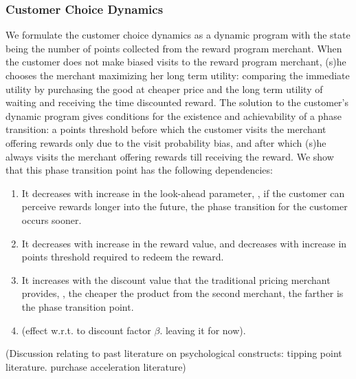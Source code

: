 \subsubsection{Customer Choice Dynamics}
We formulate the customer choice dynamics as a dynamic program with the state being the number of points collected from the reward program merchant.
When the customer does not make biased visits to the reward program merchant, (s)he chooses the merchant maximizing her long term utility: comparing the immediate utility by purchasing the good at cheaper price and the long term utility of waiting and receiving the time discounted reward.
The solution to the customer's dynamic program gives conditions for the existence and achievability of a phase transition: a points threshold before which the customer visits the merchant offering rewards only due to the visit probability bias, and after which (s)he always visits the merchant offering rewards till receiving the reward.
We show that this phase transition point has the following dependencies:
\begin{enumerate}
\item It decreases with increase in the look-ahead parameter, \ie, if the customer can perceive rewards longer into the future, the phase transition for the customer occurs sooner.
\item It decreases with increase in the reward value, and decreases with increase in points threshold required to redeem the reward. 
\item It increases with the discount value that the traditional pricing merchant provides, \ie, the cheaper the product from the second merchant, the farther is the phase transition point. 
\item {\arpit(effect w.r.t. to discount factor $\beta$. leaving it for now).}
\end{enumerate}

{\arpit(Discussion relating to past literature on psychological constructs: tipping point literature. purchase acceleration literature)}

